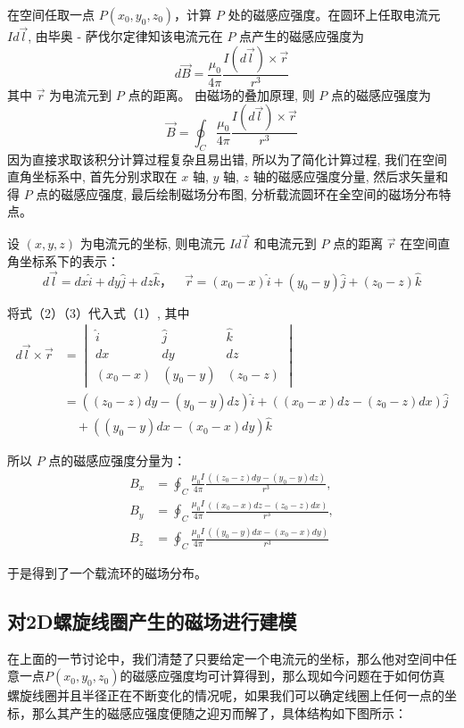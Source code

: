 \documentclass{article}
\begin{document}
在空间任取一点 \(P(x_0, y_0, z_0)\)，计算 \(P\) 处的磁感应强度。在圆环上任取电流元 \(Id\vec{l}\), 由毕奥 - 萨伐尔定律知该电流元在 \(P\) 点产生的磁感应强度为
\[
d\vec{B} = \frac{\mu_0}{4\pi} \frac{I(d\vec{l}) \times \vec{r}}{r^3}
\]
其中 \(\vec{r}\) 为电流元到 \(P\) 点的距离。
由磁场的叠加原理, 则 \(P\) 点的磁感应强度为
\[
\vec{B} = \oint_C \frac{\mu_0}{4\pi} \frac{I(d\vec{l}) \times \vec{r}}{r^3}
\]
因为直接求取该积分计算过程复杂且易出错, 所以为了简化计算过程, 我们在空间直角坐标系中, 首先分别求取在 \(x\) 轴, \(y\) 轴, \(z\) 轴的磁感应强度分量, 然后求矢量和得 \(P\) 点的磁感应强度, 最后绘制磁场分布图, 分析载流圆环在全空间的磁场分布特点。

设 \((x, y, z)\) 为电流元的坐标, 则电流元 \(I d\vec{l}\) 和电流元到 \(P\) 点的距离 \(\vec{r}\) 在空间直角坐标系下的表示：
\[
d\vec{l} = dx\hat{i} + dy\hat{j} + dz\hat{k}， \quad \vec{r} = (x_0-x)\hat{i} + (y_0-y)\hat{j} + (z_0-z)\hat{k}
\]

将式（2）（3）代入式（1）, 其中
\[
\begin{aligned}
    d\vec{l} \times \vec{r} &= \begin{vmatrix}
        \hat{i} & \hat{j} & \hat{k} \\
        dx & dy & dz \\
        (x_0-x) & (y_0-y) & (z_0-z)
        \end{vmatrix} \\
        &= ((z_0-z)dy - (y_0-y)dz)\hat{i} + ((x_0-x)dz - (z_0-z)dx)\hat{j} \\
        &\quad + ((y_0-y)dx - (x_0-x)dy)\hat{k}
\end{aligned}
\]

所以 \(P\) 点的磁感应强度分量为：
\[
\begin{aligned}
    B_x &= \oint_C \frac{\mu_0 I}{4\pi} \frac{((z_0-z)dy - (y_0-y)dz)}{r^3}, \\
    B_y &= \oint_C \frac{\mu_0 I}{4\pi} \frac{((x_0-x)dz - (z_0-z)dx)}{r^3}, \\
    B_z &= \oint_C \frac{\mu_0 I}{4\pi} \frac{((y_0-y)dx - (x_0-x)dy)}{r^3}
\end{aligned}
\]

于是得到了一个载流环的磁场分布。

\subsection{对2D螺旋线圈产生的磁场进行建模}
在上面的一节讨论中，我们清楚了只要给定一个电流元的坐标，那么他对空间中任意一点$P(x_0, y_0, z_0)$的磁感应强度均可计算得到，那么现如今问题在于如何仿真螺旋线圈并且半径正在不断变化的情况呢，如果我们可以确定线圈上任何一点的坐标，那么其产生的磁感应强度便随之迎刃而解了，具体结构如下图所示：
\end{document}
